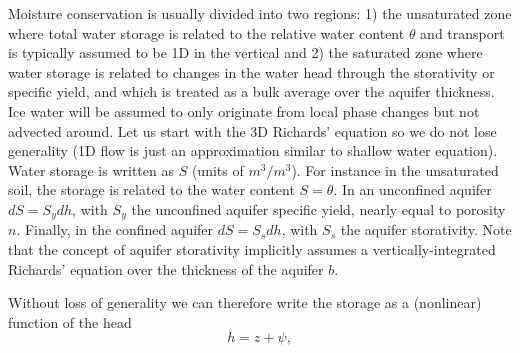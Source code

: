 \documentclass{report}
\begin{document}
Moisture conservation is usually divided into two regions: 1) the unsaturated zone where total water storage is related to the relative water content $\theta$ and transport is typically assumed to be 1D in the vertical and 2) the saturated zone where water storage is related to changes in the water head through the storativity or specific yield, and which is treated as a bulk average over the aquifer thickness. Ice water will be assumed to only originate from local phase changes but not advected around. 
Let us start with the 3D Richards' equation so we do not lose generality (1D flow is just an approximation similar to shallow water equation). Water storage is written as $S$ (units of $m^3/m^3$). For instance in the unsaturated soil, the storage is related to the water content $S=\theta$. In an unconfined aquifer $dS=S_y dh$, with $S_y$ the unconfined aquifer specific yield, nearly equal to porosity $n$. Finally, in the confined aquifer $dS=S_s dh$, with $S_s$ the aquifer storativity. Note that the concept of aquifer storativity implicitly assumes a vertically-integrated Richards' equation over the thickness of the aquifer $b$. 

Without loss of generality we can therefore write the storage as a (nonlinear) function of the head 
\begin{equation}
     h=z+\psi,
\label{head}
\end{equation}
\end{document}
